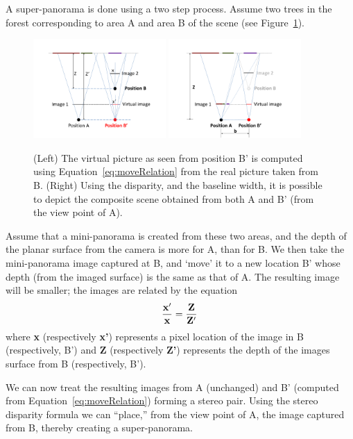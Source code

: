 \documentclass[11pt]{article}
\begin{document}
A super-panorama is done using a two step process. Assume two trees in
the forest corresponding to area A and area B of the scene (see
Figure~\ref{fig:stereo}). 
\begin{figure}[h!]
  \centering
  \includegraphics[width=0.45\textwidth]{mosaicing/figures/move} 
  \includegraphics[width=0.45\textwidth]{mosaicing/figures/stereo} 
  \caption{ \label{fig:stereo} (Left) The virtual picture as seen from position
  B' is computed using Equation~\ref{eq:moveRelation} from the real picture
    taken from B.  (Right) Using the disparity, and the baseline width,
  it is possible to depict the composite scene obtained from both A
  and B' (from the view point of A).}
\end{figure}    
Assume that a mini-panorama is created from these two areas, and the
depth of the planar surface from the camera is more for A, than for
B. We then take the mini-panorama image captured at B, and `move' it to
a new location B' whose depth (from the imaged surface) is the same as
that of A. The resulting image  will be smaller; the images are
related by the equation
\begin{equation}
  \label{eq:moveRelation}
  {\bf \frac{x'}{x} = \frac{Z}{Z'}}
\end{equation}
where {\bf x} (respectively {\bf x'}) represents a pixel location of
the image in B (respectively, B') and 
{\bf Z} (respectively {\bf Z'}) represents the depth of the images
surface from B (respectively, B').

We can now treat the resulting images from A (unchanged) and B’
(computed from Equation~\ref{eq:moveRelation}) forming a stereo pair.
Using the stereo disparity formula we can ``place,'' from the view
point of A, the image captured from B, thereby creating a
super-panorama.
\end{document}
